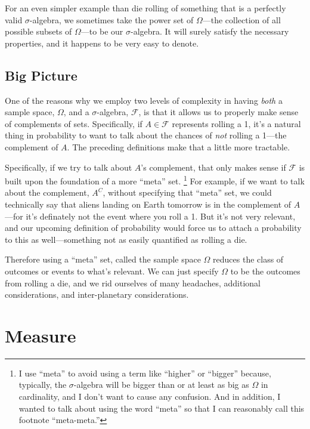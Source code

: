 \documentclass[a4paper,12pt]{scrartcl}
\begin{document}
For an even simpler example than die rolling of something that is 
a perfectly valid $\sigma$-algebra, we 
sometimes take the power set of $\Omega$---the collection of all 
possible subsets of $\Omega$---to be our $\sigma$-algebra.  It will 
surely satisfy the necessary properties, and it happens to be very easy
to denote.

\subsection{Big Picture}

One of the reasons why we employ two levels of complexity in having
\emph{both} a sample space, $\Omega$,
and a $\sigma$-algebra, $\mathcal{F}$, is that it allows us to 
properly make sense of complements of sets.  Specifically, if $A \in
\mathcal{F}$ represents rolling a 1, it's a natural thing in 
probability to want to talk about the chances of \emph{not} rolling
a 1---the complement of $A$. The preceding definitions make that a
little more tractable.

Specifically, if we try to talk about $A$'s complement, that only
makes sense if $\mathcal{F}$ is built upon the foundation of a
more ``meta'' set. \footnote{I use ``meta'' to avoid using a term
like ``higher'' or ``bigger'' because, typically, the $\sigma$-algebra
will be bigger than or at least as big as $\Omega$ in cardinality, 
and I don't want to cause any confusion. And
in addition, I wanted to talk about using the word ``meta'' so that
I can reasonably call this footnote ``meta-meta.''}
For example, if we want to talk about
the complement, $A^C$, without specifying that ``meta'' set, we could
technically say that aliens landing on Earth tomorrow is in the 
complement of $A$---for it's definately not the event where you 
roll a 1. But it's not very relevant, and our upcoming definition of 
probability would force us to attach a probability to this as 
well---something not as easily quantified as rolling a die. 
   
Therefore using a ``meta'' set, called the sample space $\Omega$
reduces the class of outcomes or events to what's relevant. We can 
just specify $\Omega$ to be the outcomes from rolling a die, and we
rid ourselves of many headaches, additional considerations, and 
inter-planetary considerations.

\section{Measure}
\end{document}
